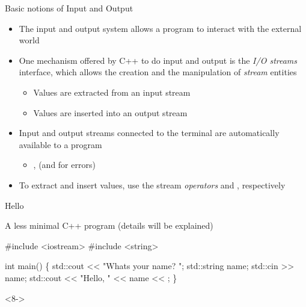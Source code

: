 \begin{frame}[fragile]{Basic notions of Input and Output}

  \begin{itemize}
  \item The input and output system allows a program to interact with the
    external world
  \item One mechanism offered by C++ to do input and output is the \textit{I/O
      streams} interface, which allows the creation and the manipulation of
    \textit{stream} entities
    \begin{itemize}
    \item Values are extracted from an input stream
    \item Values are inserted into an output stream
    \end{itemize}
  \item Input and output streams connected to the terminal are automatically
    available to a program
    \begin{itemize}
    \item {},  (and  for errors)
    \end{itemize}
  \item To extract and insert values, use the stream \textit{operators}
    \code{>>} and \code{<<}, respectively
  \end{itemize}

\end{frame}

\begin{frame}[fragile]{Hello}

  A less minimal C++ program (details will be explained)

  \begin{codeblock}
\alert<2|trans:0>{#include <iostream>}
\alert<2|trans:0>{#include <string>}

int \alert<3|trans:0>{main}()
\{
\alert<4|trans:0>{  std::cout << "What\textquotesingle{}s your name? ";}
\alert<5|trans:0>{  std::string name;}
\alert<6|trans:0>{  std::cin >> name;}
\alert<7|trans:0>{  std::cout << "Hello, " << name << \bslashn{};}
\}\end{codeblock}

\begin{shellblock}<8->{
}\end{shellblock}

\end{frame}

